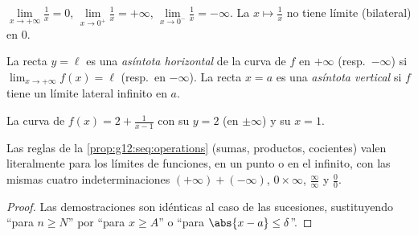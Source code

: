\begin{example}
$\lim\limits_{x\to+\infty} \frac{1}{x} = 0$,
$\lim\limits_{x\to 0^+} \frac{1}{x} = +\infty$,
$\lim\limits_{x\to 0^-} \frac{1}{x} = -\infty$. La 
$x \mapsto \frac1x$ no tiene límite (bilateral) en $0$.
\end{example}

\begin{definition}[Asíntotas]\label{def:g12:limcont:asymptote}
La recta $y = \ell$ es una \emph{asíntota horizontal} de la
curva de $f$ en $+\infty$ (resp.\ $-\infty$) si
$\lim_{x\to+\infty} f(x) = \ell$ (resp.\ en $-\infty$). La recta $x = a$ es
una \emph{asíntota vertical} si $f$ tiene un límite lateral
infinito en $a$.
\end{definition}

\begin{omfigure}

{\small La curva de $f(x) = 2 + \frac{1}{x-1}$ con su 
$y = 2$ (en $\pm\infty$) y su  $x = 1$.}
\end{omfigure}

\begin{proposition}\label{prop:g12:limcont:operations}
Las reglas de la \cref{prop:g12:seq:operations} (sumas, productos,
cocientes) valen literalmente para los límites de funciones, en un punto o
en el infinito, con las mismas cuatro indeterminaciones
$(+\infty)+(-\infty)$, $0\times\infty$, $\frac{\infty}{\infty}$ y
$\frac{0}{0}$.
\end{proposition}

\begin{proof}
Las demostraciones son idénticas al caso de las sucesiones, sustituyendo
``para $n \geq N$'' por ``para $x \geq A$'' o ``para
$\abs{x-a} \leq \delta$''.
\end{proof}

